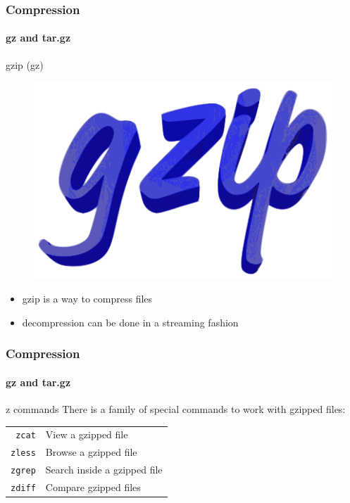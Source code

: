 \documentclass[aspectratio=169,dvipsnames]{beamer}
\begin{document}
    \begin{frame}
        \frametitle{Compression}
        \framesubtitle{gz and tar.gz}
        \begin{block}{gzip (gz)}
        \begin{figure}
        \centering
        \vspace{-6pt}
        \includegraphics[width=0.8\linewidth]{Figures/gzip.png}
        \end{figure}
            \mbox{}

        \begin{itemize}
            \item gzip is a way to compress files
            \item decompression can be done in a streaming fashion
        \end{itemize}
        \end{block}
    \end{frame}

    \begin{frame}
        \frametitle{Compression}
        \framesubtitle{gz and tar.gz}
        \begin{block}{z commands}
            There is a family of special commands to work with gzipped files:
            
            \begin{center}
            \begin{tabular}{rl}
                \texttt{zcat} & View a gzipped file \\
                \texttt{zless} & Browse a gzipped file \\
                \texttt{zgrep} & Search inside a gzipped file \\
                \texttt{zdiff} & Compare gzipped files \\
            \end{tabular}
            \end{center}
        \end{block}
    \end{frame}
\end{document}

